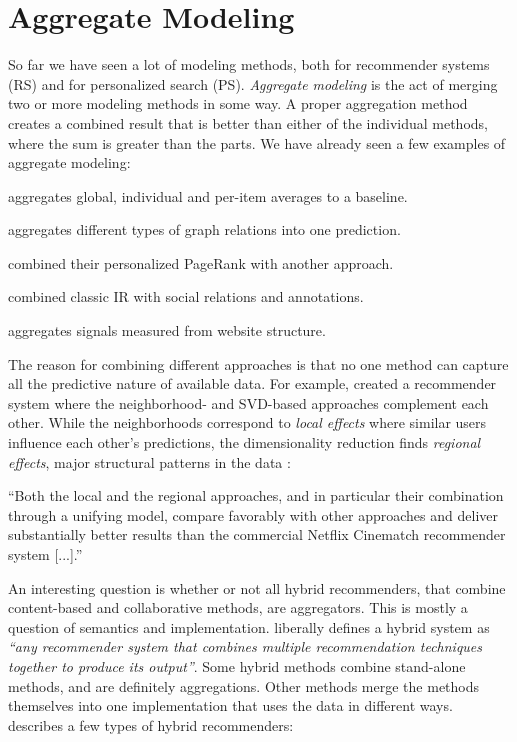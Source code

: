 \section{Aggregate Modeling}
\label{sec:aggregate}

So far we have seen a lot of modeling methods, both for recommender systems (RS) and for personalized search (PS).
\emph{Aggregate modeling} is the act of merging two or more modeling methods in some way.
A proper aggregation method creates a combined result that is better than either of the individual methods,
where the sum is greater than the parts.
We have already seen a few examples of aggregate modeling:

\begin{itemize*}
  \item \cite{Koren2008} aggregates global, individual and per-item averages to a baseline.
  \item \cite{Huang2002} aggregates different types of graph relations into one prediction.
  \item \citet{Haveliwala2003} combined their personalized PageRank with another approach.
  \item \cite{Carmel2009} combined classic IR with social relations and annotations.
  \item \citet[p.5]{Bender2005} aggregates signals measured from website structure.
\end{itemize*}

The reason for combining different approaches is that no one method can capture all the predictive nature of available data.
For example, 
\cite{Bell2007b} created a recommender system where the neighborhood- and SVD-based approaches complement each other.
While the neighborhoods correspond to \emph{local effects} where similar users influence each other's predictions,
the dimensionality reduction finds \emph{regional effects}, major structural patterns in the data \citep{Bell2007b}:

\begin{blockquote}
``Both the local and the regional approaches, and in particular their combination through a unifying model, 
compare favorably with other approaches and deliver substantially better results than the 
commercial Netflix Cinematch recommender system [...].''
\end{blockquote}

An interesting question is whether or not all hybrid recommenders,
that combine content-based and collaborative methods, are aggregators. 
This is mostly a question of semantics and implementation.
\citet[p.4]{Burke2007} liberally defines a hybrid system as 
\emph{``any recommender system that combines multiple recommendation techniques together to produce its output''}.
Some hybrid methods combine stand-alone methods, and are definitely aggregations.
Other methods merge the methods themselves into one implementation that uses the data in different ways.
\citeauthor{Burke2007} describes a few types of hybrid recommenders:

